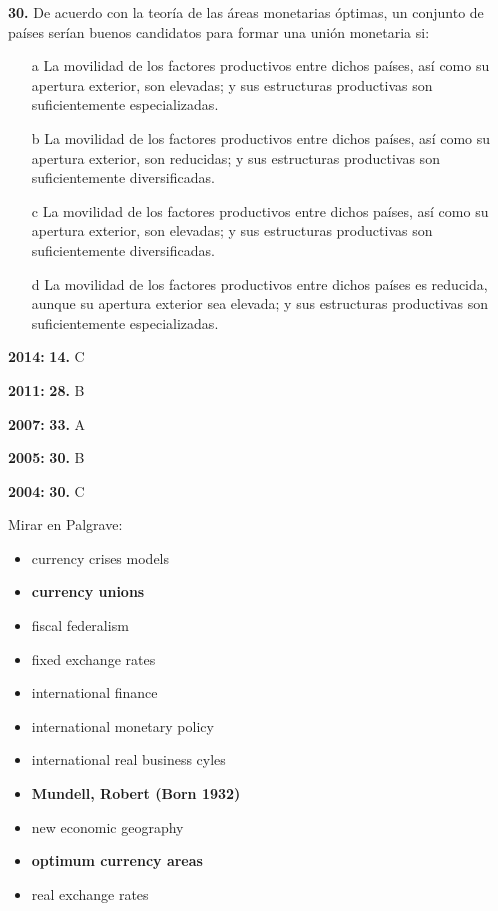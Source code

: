 \documentclass{nuevotema}
\begin{document}
\textbf{30.} De acuerdo con la teoría de las áreas monetarias óptimas, un conjunto de países serían buenos candidatos para formar una unión monetaria si:
\begin{itemize}
	\item[a] La movilidad de los factores productivos entre dichos países, así como su apertura exterior, son elevadas; y sus estructuras productivas son suficientemente especializadas.
	\item[b] La movilidad de los factores productivos entre dichos países, así como su apertura exterior, son reducidas; y sus estructuras productivas son suficientemente diversificadas. 
	\item[c] La movilidad de los factores productivos entre dichos países, así como su apertura exterior, son elevadas; y sus estructuras productivas son suficientemente diversificadas.
	\item[d] La movilidad de los factores productivos entre dichos países es reducida, aunque su apertura exterior sea elevada; y sus estructuras productivas son suficientemente especializadas.
\end{itemize}

\notas

\textbf{2014:} \textbf{14.} C

\textbf{2011:} \textbf{28.} B

\textbf{2007:} \textbf{33.} A

\textbf{2005:} \textbf{30.} B

\textbf{2004:} \textbf{30.} C

\bibliografia

Mirar en Palgrave:
\begin{itemize}
	\item currency crises models
	\item \textbf{currency unions}
	\item fiscal federalism
	\item fixed exchange rates
	\item international finance
	\item international monetary policy
	\item international real business cyles
	\item \textbf{Mundell, Robert (Born 1932)}
	\item new economic geography
	\item \textbf{optimum currency areas}
	\item real exchange rates 
\end{itemize}
\end{document}
